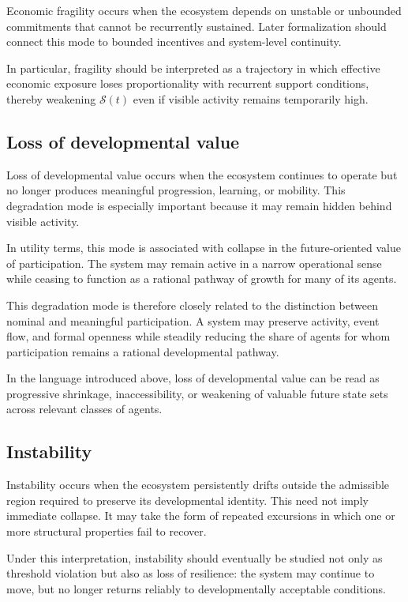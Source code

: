\documentclass[11pt]{article}
\begin{document}
Economic fragility occurs when the ecosystem depends on unstable or unbounded commitments that cannot be recurrently sustained. Later formalization should connect this mode to bounded incentives and system-level continuity.

In particular, fragility should be interpreted as a trajectory in which effective economic exposure loses proportionality with recurrent support conditions, thereby weakening \(\mathcal{S}(t)\) even if visible activity remains temporarily high.

\subsection{Loss of developmental value}

Loss of developmental value occurs when the ecosystem continues to operate but no longer produces meaningful progression, learning, or mobility. This degradation mode is especially important because it may remain hidden behind visible activity.

In utility terms, this mode is associated with collapse in the future-oriented value of participation. The system may remain active in a narrow operational sense while ceasing to function as a rational pathway of growth for many of its agents.

This degradation mode is therefore closely related to the distinction between nominal and meaningful participation. A system may preserve activity, event flow, and formal openness while steadily reducing the share of agents for whom participation remains a rational developmental pathway.

In the language introduced above, loss of developmental value can be read as progressive shrinkage, inaccessibility, or weakening of valuable future state sets across relevant classes of agents.

\subsection{Instability}

Instability occurs when the ecosystem persistently drifts outside the admissible region required to preserve its developmental identity. This need not imply immediate collapse. It may take the form of repeated excursions in which one or more structural properties fail to recover.

Under this interpretation, instability should eventually be studied not only as threshold violation but also as loss of resilience: the system may continue to move, but no longer returns reliably to developmentally acceptable conditions.
\end{document}
